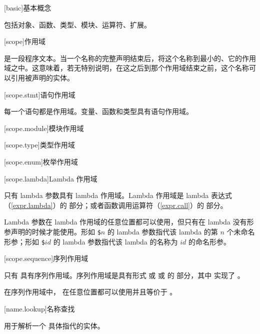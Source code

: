 
[basic]{基本概念}

\pnum
{}包括对象、函数、类型、模块、运算符、扩展。

[scope]{作用域}

\pnum
{}是一段程序文本。当一个名称的完整声明结束后，将这个名称到最小的、它的作用域之中。这意味着，若无特别说明，在这之后到那个作用域结束之前，这个名称可以引用被声明的实体。

[scope.stmt]{语句作用域}

\pnum
每一个语句都是作用域。变量、函数和类型具有语句作用域。

[scope.module]{模块作用域}

[scope.type]{类型作用域}

[scope.enum]{枚举作用域}

[scope.lambda]{Lambda 作用域}

\pnum
只有 lambda 参数具有 lambda 作用域。Lambda 作用域是 lambda 表达式（\ref{expr.lambda}）的  部分；或者函数调用运算符（\ref{expr.call}）的  部分。

\pnum
Lambda 参数在 lambda 作用域的任意位置都可以使用，但只有在 lambda 没有形参声明的时候才能使用。形如 \texttt{\$$n$} 的 lambda 参数指代该 lambda 的第 $n$ 个未命名形参；形如 \texttt{\$$id$} 的 lambda 参数指代该 lambda 的名称为 $id$ 的命名形参。

[scope.sequence]{序列作用域}

\pnum
只有 \tcode{\$} 具有序列作用域。序列作用域是具有形式  或  或  的  部分，其中  实现了 。

\pnum
在序列作用域中，\tcode{\$} 在任意位置都可以使用并且等价于 。

[name.lookup]{名称查找}

\pnum
{}用于解析一个  具体指代的实体。
